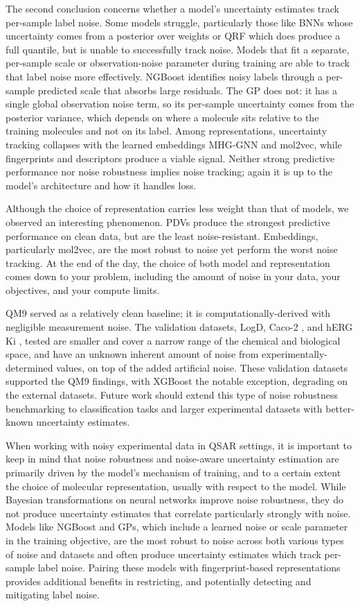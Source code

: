 The second conclusion concerns whether a model's uncertainty estimates track per-sample label noise. Some models struggle, particularly those like BNNs whose uncertainty comes from a posterior over weights or QRF which does produce a full quantile, but is unable to successfully track noise. 
Models that fit a separate, per-sample scale or observation-noise parameter during training are able to track that label noise more effectively. NGBoost identifies noisy labels through a per-sample predicted scale that absorbs large residuals. The GP does not: it has a single global observation noise term, so its per-sample uncertainty comes from the posterior variance, which depends on where a molecule sits relative to the training molecules and not on its label. Among representations, uncertainty tracking collapses with the learned embeddings MHG-GNN and mol2vec, while fingerprints and descriptors produce a viable signal. Neither strong predictive performance nor noise robustness implies noise tracking; again it is up to the model's architecture and how it handles loss. 

Although the choice of representation carries less weight than that of models, we observed an interesting phenomenon. PDVs produce the strongest predictive performance on clean data, but are the least noise-resistant. Embeddings, particularly mol2vec, are the most robust to noise yet perform the worst noise tracking. At the end of the day, the choice of both model and representation comes down to your problem, including the amount of noise in your data, your objectives, and your compute limits. 

QM9 served as a relatively clean baseline; it is computationally-derived with negligible measurement noise. The validation datasets, LogD, Caco-2 \citep{openadmet}, and hERG Ki \citep{Zdrazil2023}, tested are smaller and cover a narrow range of the chemical and biological space, and have an unknown inherent amount of noise from experimentally-determined values, on top of the added artificial noise. These validation datasets supported the QM9 findings, with XGBoost the notable exception, degrading on the external datasets. Future work should extend this type of noise robustness benchmarking to classification tasks and larger experimental datasets with better-known uncertainty estimates.

When working with noisy experimental data in QSAR settings, it is important to keep in mind that noise robustness and noise-aware uncertainty estimation are primarily driven by the model's mechanism of training, and to a certain extent the choice of molecular representation, usually with respect to the model. While Bayesian transformations on neural networks improve noise robustness, they do not produce uncertainty estimates that correlate particularly strongly with noise. Models like NGBoost and GPs, which include a learned noise or scale parameter in the training objective, are the most robust to noise across both various types of noise and datasets and often produce uncertainty estimates which track per-sample label noise. Pairing these models with fingerprint-based representations provides additional benefits in restricting, and potentially detecting and mitigating label noise. 


